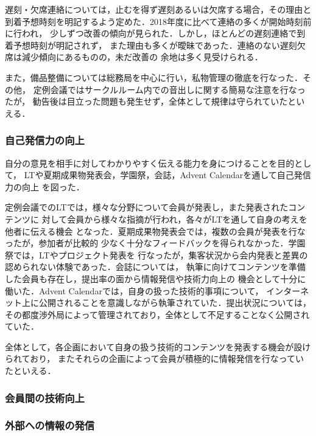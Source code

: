 遅刻・欠席連絡については，止むを得ず遅刻あるいは欠席する場合，その理由と
到着予想時刻を明記するよう定めた．2018年度に比べて連絡の多くが開始時刻前に行われ，
少しずつ改善の傾向が見られた．しかし，ほとんどの遅刻連絡で到着予想時刻が明記されず，
また理由も多くが曖昧であった．連絡のない遅刻欠席は減少傾向にあるものの，未だ改善の
余地は多く見受けられる．

また，備品整備については総務局を中心に行い，私物管理の徹底を行なった．その他，
定例会議ではサークルルーム内での音出しに関する簡易な注意を行なったが，
勧告後は目立った問題も発生せず，全体として規律は守られていたといえる．

\subsubsection*{自己発信力の向上}
自分の意見を相手に対してわかりやすく伝える能力を身につけることを目的として，
LTや夏期成果物発表会，学園祭，会誌，Advent Calendarを通して自己発信力の向上
を図った．

定例会議でのLTでは，様々な分野について会員が発表し，また発表されたコンテンツに
対して会員から様々な指摘が行われ，各々がLTを通して自身の考えを他者に伝える機会
となった．夏期成果物発表会では，複数の会員が発表を行なったが，参加者が比較的
少なく十分なフィードバックを得られなかった．学園祭では，LTやプロジェクト発表を
行なったが，集客状況から会内発表と差異の認められない体験であった．会誌については，
執筆に向けてコンテンツを準備した会員も存在し，提出率の面から情報発信や技術力向上の
機会として十分に働いた．Advent Calendarでは，自身の扱った技術的事項について，
インターネット上に公開されることを意識しながら執筆されていた．提出状況については，
その都度渉外局によって管理されており，全体として不足することなく公開されていた．

全体として，各企画において自身の扱う技術的コンテンツを発表する機会が設けられており，
またそれらの企画によって会員が積極的に情報発信を行なっていたといえる．

\subsubsection*{会員間の技術向上}

\subsubsection*{外部への情報の発信}
